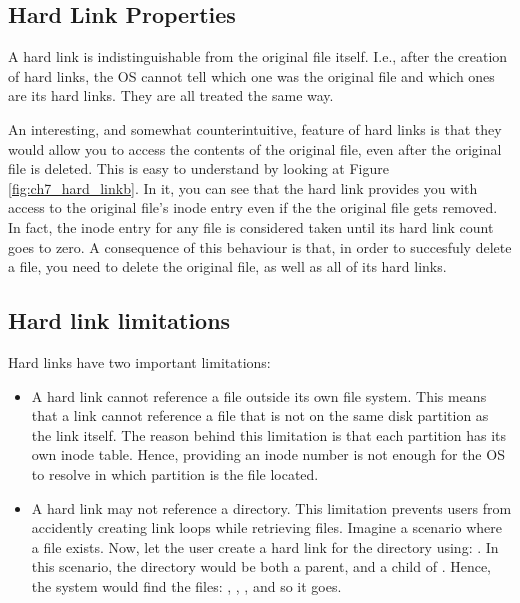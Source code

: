 \subsection{Hard Link Properties}

A hard link is indistinguishable from the original  file itself. I.e., after the creation of hard links, the \acs{OS} cannot tell which one was the original file and which ones are its hard links. They are all treated the same way.

An interesting, and somewhat counterintuitive, feature of hard links is that they would allow you to access the contents of the original file, even after the original file is deleted. This is easy to understand by looking at Figure \ref{fig:ch7_hard_linkb}. In it, you can see that the hard link provides you with access to the original file's inode entry even if the the original file gets removed. In fact, the inode entry for any file is considered taken until its hard link count goes to zero. A consequence of this behaviour is that, in order to succesfuly delete a file, you need to delete the original file, as well as all of its hard links.

\subsection{Hard link limitations}
Hard  links have  two important  limitations:
\begin{itemize}
\item A hard  link  cannot  reference  a  file  outside  its  own  file  system.  This  means that a  link cannot  reference  a  file  that  is  not  on the  same  disk partition as  the  link  itself. The reason behind this limitation is that each partition has its own inode table. Hence, providing an inode number is not enough for the \acs{OS} to resolve in which partition is the file located.
\item A hard  link may  not  reference  a  directory. This limitation prevents users from accidently creating link loops while retrieving files. Imagine a scenario where a file  exists. Now, let the user create a hard link for the  directory using: . In this scenario, the directory  would be both a parent, and a child of  . Hence, the system would find the files: , , \newline {}, and so it goes.
\end{itemize}

